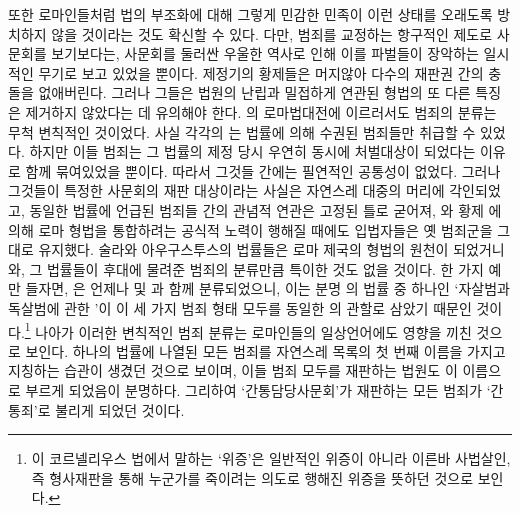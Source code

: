 또한 로마인들처럼 법의 부조화에 대해
그렇게 민감한 민족이
이런 상태를 오래도록 방치하지 않을 것이라는 것도
확신할 수 있다.
다만,
범죄를 교정하는 항구적인 제도로
사문회를
보기보다는,
사문회를 둘러싼 우울한 역사로 인해
이를 파벌들이 장악하는 일시적인 무기로 보고 있었을 뿐이다.
제정기의 황제들은 머지않아 다수의 재판권 간의 충돌을 없애버린다.
그러나 그들은 법원의 난립과 밀접하게 연관된 형법의 또 다른 특징은
제거하지 않았다는 데 유의해야 한다.
의 로마법대전에 이르러서도
범죄의 분류는 무척 변칙적인 것이었다.
사실
각각의 는
법률에 의해 수권된 범죄들만 취급할 수 있었다.
하지만 이들 범죄는
그 법률의 제정 당시
우연히
동시에 처벌대상이 되었다는 이유로
함께 묶여있었을 뿐이다.
따라서
그것들 간에는 필연적인 공통성이 없었다.
그러나
그것들이 특정한 사문회의 재판 대상이라는 사실은
자연스레 대중의 머리에 각인되었고,
동일한 법률에 언급된 범죄들 간의 관념적 연관은
고정된 틀로 굳어져,
와
황제 에 의해
로마 형법을 통합하려는 공식적 노력이 행해질 때에도
입법자들은 옛 범죄군을
그대로 유지했다.
술라와 아우구스투스의 법률들은
로마 제국의 형법의 원천이 되었거니와,
그 법률들이 후대에 물려준 범죄의 분류만큼
특이한 것도 없을 것이다.
한 가지 예만 들자면,
은 언제나
 및
과 함께 분류되었으니,
이는 분명
의 법률 중 하나인
`자살범과 독살범에 관한
'이
이 세 가지 범죄 형태 모두를 동일한 의 관할로 삼았기
때문인 것이다.\footnote{%
  이 코르넬리우스 법에서 말하는 `위증'은 일반적인 위증이 아니라
  이른바 사법살인, 즉 형사재판을 통해 누군가를 죽이려는 의도로
  행해진 위증을 뜻하던 것으로 보인다.
   }
나아가
이러한 변칙적인 범죄 분류는 로마인들의 일상언어에도 영향을 끼친 것으로 보인다.
하나의 법률에 나열된 모든 범죄를
자연스레
목록의 첫 번째 이름을 가지고 지칭하는 습관이 생겼던 것으로 보이며,
이들 범죄 모두를 재판하는 법원도 이 이름으로  부르게 되었음이 분명하다.
그리하여
`간통담당사문회'가 재판하는
모든 범죄가 `간통죄'로 불리게 되었던 것이다.

